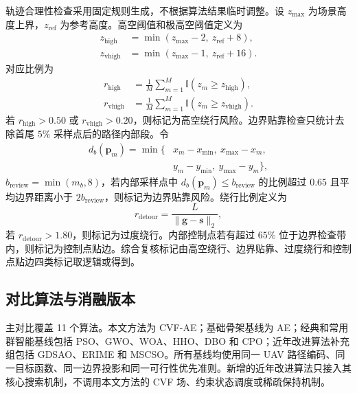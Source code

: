 轨迹合理性检查采用固定规则生成，不根据算法结果临时调整。设 $z_{\max}$ 为场景高度上界，$z_{\mathrm{ref}}$ 为参考高度。高空阈值和极高空阈值定义为
\begin{equation}
    \begin{aligned}
    z_{\mathrm{high}}&=\min(z_{\max}-2,\ z_{\mathrm{ref}}+8),\\
    z_{\mathrm{vhigh}}&=\min(z_{\max}-1,\ z_{\mathrm{ref}}+16).
    \end{aligned}
    \label{eq:height-review-thresholds}
\end{equation}
对应比例为
\begin{equation}
    \begin{aligned}
    r_{\mathrm{high}}&=
    \frac{1}{M}\sum_{m=1}^{M}
    \mathbb I(z_m\geq z_{\mathrm{high}}),\\
    r_{\mathrm{vhigh}}&=
    \frac{1}{M}\sum_{m=1}^{M}
    \mathbb I(z_m\geq z_{\mathrm{vhigh}}).
    \end{aligned}
    \label{eq:height-review-rates}
\end{equation}
若 $r_{\mathrm{high}}>0.50$ 或 $r_{\mathrm{vhigh}}>0.20$，则标记为高空绕行风险。边界贴靠检查只统计去除首尾 $5\%$ 采样点后的路径内部段。令
\begin{equation}
    \begin{aligned}
    d_b(\mathbf p_m)=\min\{&
    x_m-x_{\min},\ x_{\max}-x_m,\\
    &y_m-y_{\min},\ y_{\max}-y_m\},
    \end{aligned}
    \label{eq:boundary-review-distance}
\end{equation}
$b_{\mathrm{review}}=\min(m_b,8)$，若内部采样点中 $d_b(\mathbf p_m)\leq b_{\mathrm{review}}$ 的比例超过 $0.65$ 且平均边界距离小于 $2b_{\mathrm{review}}$，则标记为边界贴靠风险。绕行比例定义为
\begin{equation}
    r_{\mathrm{detour}}=
    \frac{L}{\|\mathbf g-\mathbf s\|_2},
    \label{eq:detour-ratio}
\end{equation}
若 $r_{\mathrm{detour}}>1.80$，则标记为过度绕行。内部控制点若有超过 $65\%$ 位于边界检查带内，则标记为控制点贴边。综合复核标记由高空绕行、边界贴靠、过度绕行和控制点贴边四类标记取逻辑或得到。

\subsection{对比算法与消融版本}

主对比覆盖 11 个算法。本文方法为 CVF-AE；基础骨架基线为 AE；经典和常用群智能基线包括 PSO、GWO、WOA、HHO、DBO 和 CPO；近年改进算法补充组包括 GDSAO、ERIME 和 MSCSO。所有基线均使用同一 UAV 路径编码、同一目标函数、同一边界投影和同一可行性优先准则。新增的近年改进算法只接入其核心搜索机制，不调用本文方法的 CVF 场、约束状态调度或稀疏保持机制。

